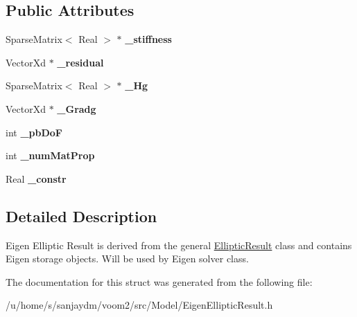 \subsection*{Public Attributes}
\begin{DoxyCompactItemize}
\item 
\hypertarget{structvoom_1_1_eigen_elliptic_result_aaba0125035e86c4baed44f66b9bfa6d1}{
SparseMatrix$<$ Real $>$ $\ast$ {\bfseries \_\-stiffness}}
\label{structvoom_1_1_eigen_elliptic_result_aaba0125035e86c4baed44f66b9bfa6d1}

\item 
\hypertarget{structvoom_1_1_eigen_elliptic_result_a3d9f5cffe2edee3c1f2a0a7521de5232}{
VectorXd $\ast$ {\bfseries \_\-residual}}
\label{structvoom_1_1_eigen_elliptic_result_a3d9f5cffe2edee3c1f2a0a7521de5232}

\item 
\hypertarget{structvoom_1_1_eigen_elliptic_result_a84d0ee3ba7576b0fb47d7178468ce278}{
SparseMatrix$<$ Real $>$ $\ast$ {\bfseries \_\-Hg}}
\label{structvoom_1_1_eigen_elliptic_result_a84d0ee3ba7576b0fb47d7178468ce278}

\item 
\hypertarget{structvoom_1_1_eigen_elliptic_result_af4744cf8a5b94c2a0f181e028584597a}{
VectorXd $\ast$ {\bfseries \_\-Gradg}}
\label{structvoom_1_1_eigen_elliptic_result_af4744cf8a5b94c2a0f181e028584597a}

\item 
\hypertarget{structvoom_1_1_eigen_elliptic_result_afbe730f7ab5c8d36f1cb20c06e509d4a}{
int {\bfseries \_\-pbDoF}}
\label{structvoom_1_1_eigen_elliptic_result_afbe730f7ab5c8d36f1cb20c06e509d4a}

\item 
\hypertarget{structvoom_1_1_eigen_elliptic_result_a5bb9f9b78c3f5e7ae4f5323252cffb67}{
int {\bfseries \_\-numMatProp}}
\label{structvoom_1_1_eigen_elliptic_result_a5bb9f9b78c3f5e7ae4f5323252cffb67}

\item 
\hypertarget{structvoom_1_1_eigen_elliptic_result_a80e03fcdad2b79adf268ea221946453b}{
Real {\bfseries \_\-constr}}
\label{structvoom_1_1_eigen_elliptic_result_a80e03fcdad2b79adf268ea221946453b}

\end{DoxyCompactItemize}


\subsection{Detailed Description}
Eigen Elliptic Result is derived from the general \hyperlink{structvoom_1_1_elliptic_result}{EllipticResult} class and contains Eigen storage objects. Will be used by Eigen solver class. 

The documentation for this struct was generated from the following file:\begin{DoxyCompactItemize}
\item 
/u/home/s/sanjaydm/voom2/src/Model/EigenEllipticResult.h\end{DoxyCompactItemize}

